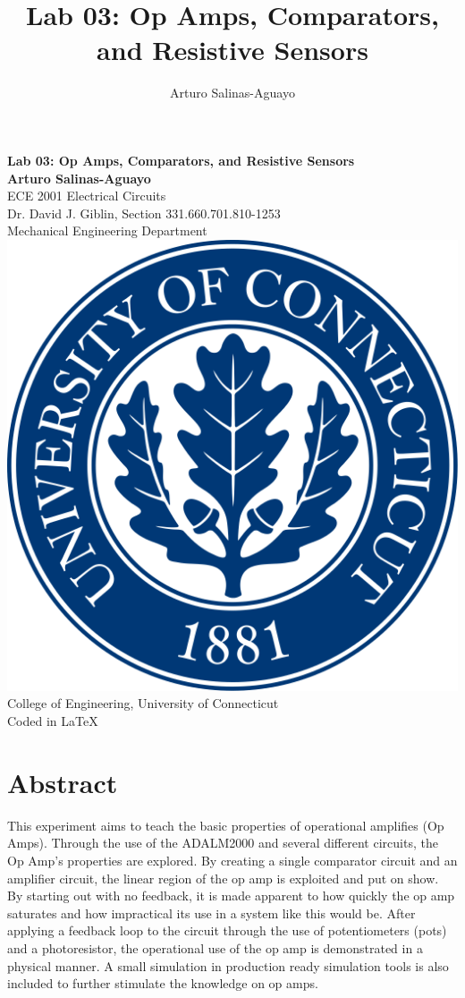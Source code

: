 \documentclass[12pt]{article}
\author{Arturo Salinas-Aguayo}
\title{Lab 03: Op Amps, Comparators, and Resistive Sensors}
\begin{document}
\newcommand{\closure}[2][3]{%
	{}\mkern#1mu\overline{\mkern-#1mu#2}}
\newcommand\ncoverline[1]{\mkern1mu\overline{\mkern-1mu#1\mkern-1mu}\mkern1mu}
\begin{titlepage}
	\centering
	\vspace*{3cm}
	\huge\textbf{Lab 03: Op Amps, Comparators, and Resistive Sensors}\\
	\vspace{5cm}
	\Large\textbf{Arturo Salinas-Aguayo}\\
	\normalsize
	ECE 2001 Electrical Circuits\\
	Dr. David J. Giblin, Section 331.660.701.810-1253\\
	Mechanical Engineering Department
	\vfill
	\includegraphics[scale=0.1]{uconnlogo}\\
	College of Engineering, University of Connecticut\\
	\scriptsize{Coded in \LaTeX}
	\vspace*{1cm}
\end{titlepage}
\tableofcontents
\newpage
\section{Abstract}
This experiment aims to teach the basic properties of operational amplifies (Op
Amps). Through the use of the ADALM2000 and several different circuits, the Op
Amp's properties are explored. By creating a single comparator circuit and an
amplifier circuit, the linear region of the op amp is exploited and put on show.
By starting out with no feedback, it is made apparent to how quickly
the op amp saturates and how impractical its use in a system like this would be.
After applying a feedback loop to the circuit through the use of potentiometers
(pots) and a photoresistor, the operational use of the op amp is demonstrated in
a physical manner. A small simulation in production ready simulation tools is
also included to further stimulate the knowledge on op amps.
\newpage
\end{document}
